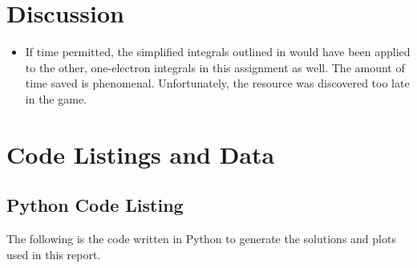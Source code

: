 \documentclass[10pt, oneside, letterpaper]{article}
\begin{document}


\newpage
\section{Discussion}

\begin{itemize}
    \item If time permitted, the simplified integrals outlined in \cite{molecular-integrals-over-gaussian-basis-functions} would have been applied to the other, one-electron integrals in this assignment as well. The amount of time saved is phenomenal. Unfortunately, the resource was discovered too late in the game.
\end{itemize}

\newpage
\section{Code Listings and Data}

\subsection{Python Code Listing}
\label{code-listing-python}
The following is the code written in Python to generate the solutions and plots used in this report.


\nocite{*}

\newpage


\end{document}
